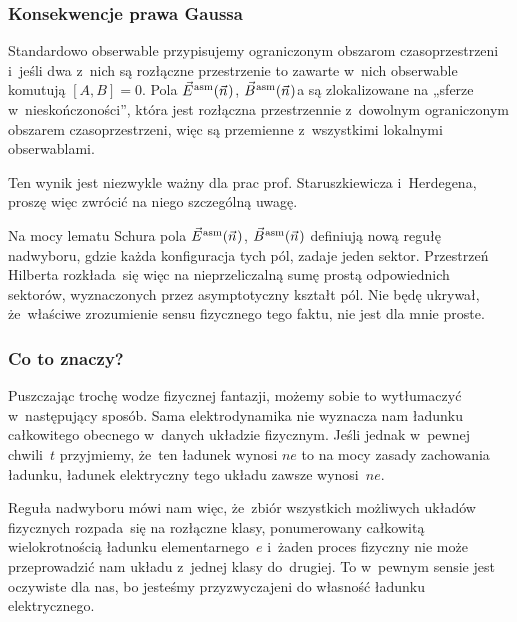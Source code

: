 \documentclass[10pt,t]{beamer}
\begin{document}
\begin{frame}
  \frametitle{Konsekwencje prawa Gaussa}


  Standardowo obserwable przypisujemy ograniczonym obszarom
  czasoprzestrzeni i~jeśli dwa z~nich są rozłączne przestrzenie to zawarte
  w~nich obserwable komutują $[ A, B ] = 0$. Pola $\vec{E}^{ \hspace{0.05em} \text{asm} }( \vec{n} \hspace{0.05em} )$,
  $\vec{B}^{ \hspace{0.05em} \text{asm} }( \vec{n} \hspace{0.05em} )$a są zlokalizowane na „sferze w~nieskończoności”, która jest
  rozłączna przestrzennie z~dowolnym ograniczonym obszarem
  czasoprzestrzeni, więc są przemienne z~wszystkimi lokalnymi obserwablami.

  Ten wynik jest niezwykle ważny dla prac prof. Staruszkiewicza i~Herdegena,
  proszę więc zwrócić na niego szczególną uwagę.

  Na mocy lematu Schura pola $\vec{E}^{ \hspace{0.05em} \text{asm} }( \vec{n} \hspace{0.05em} )$, $\vec{B}^{ \hspace{0.05em} \text{asm} }( \vec{n} \hspace{0.05em} )$ definiują nową regułę
  nadwyboru, gdzie każda konfiguracja tych pól, zadaje jeden sektor.
  Przestrzeń Hilberta rozkłada~się więc na \alert{nieprzeliczalną} sumę
  prostą odpowiednich sektorów, wyznaczonych przez asymptotyczny kształt
  pól. Nie będę ukrywał, że~właściwe zrozumienie sensu fizycznego tego
  faktu, nie jest dla mnie proste.

\end{frame}





\begin{frame}
  \frametitle{Co to znaczy?}


  Puszczając trochę wodze fizycznej fantazji, możemy sobie to wytłumaczyć
  w~następujący sposób. Sama elektrodynamika nie wyznacza nam ładunku
  całkowitego obecnego w~danych układzie fizycznym. Jeśli jednak w~pewnej
  chwili~$t$ przyjmiemy, że~ten ładunek wynosi $n e$ to na mocy zasady
  zachowania ładunku, ładunek elektryczny tego układu \alert{zawsze}
  wynosi~$n e$.

  Reguła nadwyboru mówi nam więc, że~zbiór wszystkich możliwych układów
  fizycznych rozpada~się na rozłączne klasy, ponumerowany całkowitą
  wielokrotnością ładunku elementarnego~$e$ i~\alert{żaden} proces fizyczny
  nie może przeprowadzić nam układu z~jednej klasy do~drugiej. To w~pewnym
  sensie jest oczywiste dla nas, bo jesteśmy przyzwyczajeni do własność
  ładunku elektrycznego.


\end{frame}
\end{document}
